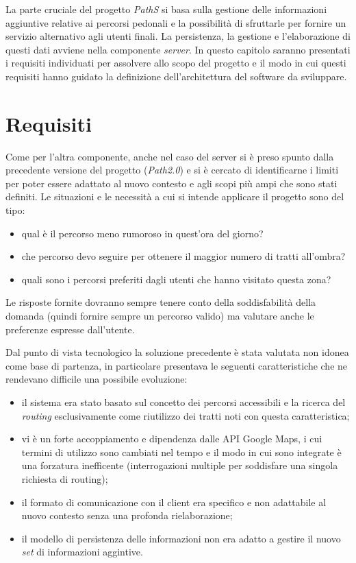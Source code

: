 La parte cruciale del progetto \emph{PathS} si basa sulla gestione delle informazioni aggiuntive relative ai percorsi pedonali e la possibilità di sfruttarle per fornire un servizio alternativo agli utenti finali. La persistenza, la gestione e l'elaborazione di questi dati avviene nella componente \emph{server}. 
In questo capitolo saranno presentati i requisiti individuati per assolvere allo scopo del progetto e il modo in cui questi requisiti hanno guidato la definizione dell'architettura del software da sviluppare.

\section{Requisiti}
Come per l'altra componente, anche nel caso del server si è preso spunto dalla precedente versione del progetto (\emph{Path2.0}) e si è cercato di identificarne i limiti per poter essere adattato al nuovo contesto e agli scopi più ampi che sono stati definiti. Le situazioni e le necessità a cui si intende applicare il progetto sono del tipo:
\begin{itemize}
\item qual è il percorso meno rumoroso in quest’ora del giorno?
\item che percorso devo seguire per ottenere il maggior numero di tratti all’ombra?
\item quali sono i percorsi preferiti dagli utenti che hanno visitato questa zona?
\end{itemize}
Le risposte fornite dovranno sempre tenere conto della soddisfabilità della domanda (quindi fornire sempre un percorso valido) ma valutare anche le preferenze espresse dall’utente.

Dal punto di vista tecnologico la soluzione precedente è stata valutata non idonea come base di partenza, in particolare presentava le seguenti caratteristiche che ne rendevano difficile una possibile evoluzione:
\begin{itemize}
\item il sistema era stato basato sul concetto dei percorsi accessibili e la ricerca del \emph{routing} esclusivamente come riutilizzo dei tratti noti con questa caratteristica;
\item vi è un forte accoppiamento e dipendenza dalle API Google Maps, i cui termini di utilizzo sono cambiati nel tempo e il modo in cui sono integrate è una forzatura inefficente (interrogazioni multiple per soddisfare una singola richiesta di routing);
\item il formato di comunicazione con il client era specifico e non adattabile al nuovo contesto senza una profonda rielaborazione;
\item il modello di persistenza delle informazioni non era adatto a gestire il nuovo \emph{set} di informazioni aggintive.
\end{itemize}

